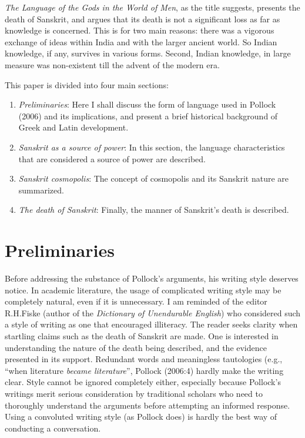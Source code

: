 {\sl The Language of the Gods in the World of Men}, as the title suggests, presents the death of Sanskrit, and argues that its death is not a significant loss as far as knowledge is concerned. This is for two main reasons: there was a vigorous exchange of ideas within India and with the larger ancient world. So Indian knowledge, if any, survives in various forms. Second, Indian knowledge, in large measure was non-existent till the advent of the modern era.

This paper is divided into four main sections: 

\begin{enumerate}
\item {\sl Preliminaries}: Here I shall discuss the form of language used in Pollock (2006) and its implications, and present a brief historical background of Greek and Latin development.
\item  {\sl Sanskrit as a source of power}: In this section, the language characteristics that are considered a source of power are described. 
\item  {\sl Sanskrit cosmopolis}: The concept of cosmopolis and its Sanskrit nature are summarized.
\item  {\sl The death of Sanskrit}: Finally, the manner of Sanskrit’s death is described.
\end{enumerate}
\newpage

\section{Preliminaries}

Before addressing the substance of Pollock’s arguments, his writing style deserves notice. In academic literature, the usage of complicated writing style may be completely natural, even if it is unnecessary. I am reminded of the editor R.H.Fiske (author of the {\sl Dictionary of Unendurable English}) who considered such a style of writing as one that encouraged illiteracy. The reader seeks clarity when startling claims such as the death of Sanskrit are made. One is interested in understanding the nature of the death being described, and the evidence presented in its support. Redundant words and meaningless tautologies (e.g., “when literature {\sl became literature}”, Pollock (2006:4) hardly make the writing clear. Style cannot be ignored completely either, especially because Pollock’s writings merit serious consideration by traditional scholars who need to thoroughly understand the arguments before attempting an informed response. Using a convoluted writing style (as Pollock does) is hardly the best way of conducting a conversation.

